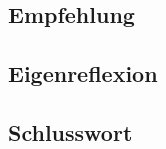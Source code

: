 \documentclass[../../main.tex]{subfiles}
\begin{document}
\subsection{Empfehlung}


\subsection{Eigenreflexion}


\subsection{Schlusswort}

\end{document}
